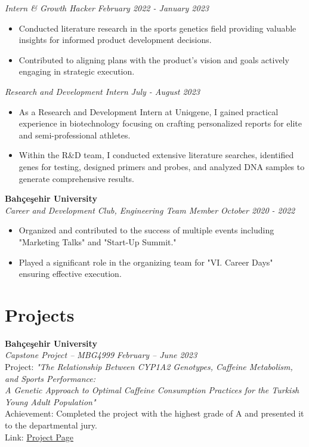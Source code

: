 \documentclass[a4paper,10pt]{article}
\newcommand{\sepspace}{\noindent\makebox[\linewidth]{\rule{\textwidth}{0.4pt}}}
\begin{document}
\noindent\textit{Intern \& Growth Hacker} \hfill \textit{February 2022 - January 2023} \\
\begin{itemize}[noitemsep]
    \item Conducted literature research in the sports genetics field providing valuable insights for informed product development decisions.
    \item Contributed to aligning plans with the product's vision and goals actively engaging in strategic execution.
\end{itemize}

\noindent\textit{Research and Development Intern} \hfill \textit{July - August 2023} \\
\begin{itemize}[noitemsep]
    \item As a Research and Development Intern at Uniqgene, I gained practical experience in biotechnology focusing on crafting personalized reports for elite and semi-professional athletes.
    \item Within the R\&D team, I conducted extensive literature searches, identified genes for testing, designed primers and probes, and analyzed DNA samples to generate comprehensive results.
\end{itemize}

\noindent\textbf{Bahçeşehir University} \\
\textit{Career and Development Club, Engineering Team Member} \hfill \textit{October 2020 - 2022} \\
\begin{itemize}[noitemsep]
    \item Organized and contributed to the success of multiple events including "Marketing Talks" and "Start-Up Summit."
    \item Played a significant role in the organizing team for "VI. Career Days" ensuring effective execution.
\end{itemize}

\sepspace

\vspace{0.5cm}



\section*{Projects}
\noindent\textbf{Bahçeşehir University} \\
\textit{Capstone Project – MBG4999} \hfill \textit{February – June 2023} \\
Project: \textit{"The Relationship Between CYP1A2 Genotypes, Caffeine Metabolism, and Sports Performance: \\ 
A Genetic Approach to Optimal Caffeine Consumption Practices for the Turkish Young Adult Population"} \\
Achievement: Completed the project with the highest grade of A and presented it to the departmental jury. \\
Link: \href{https://github.com/ugrersoz/Capstone_Project}{Project Page}
\end{document}
